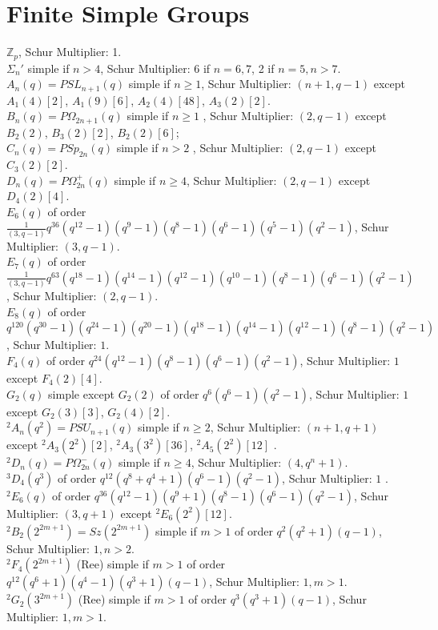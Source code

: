 \section{Finite Simple Groups}
${\mathbb Z}_p$, Schur Multiplier: 1.
\\
$\Sigma_n'$ simple if $n>4$,
Schur Multiplier: 6 if $n= 6,7$, 2 if $n=5, n>7$.
\\
$A_n (q) = PSL_{n+1}(q)$ simple if $ n \geq 1$, 
Schur Multiplier: $(n+1,q-1)$ except 
$A_1(4) [2]$,
$A_1(9) [6]$,
$A_2(4) [48]$,
$A_3(2) [2]$.
\\
$B_n (q)= P\Omega_{2n+1}(q)$
simple if $ n \geq 1$ , Schur Multiplier: $(2,q-1)$ except
$B_2(2)$,
$B_3(2) [2]$,
$B_2(2) [6]$;
\\
$C_n (q)= PSp_{2n} (q)$ simple if $n > 2$ , Schur Multiplier: 
$(2,q-1)$ except $C_3(2) [2]$.
\\
$D_n (q)= P\Omega_{2n}^{+}(q)$ simple if $n \geq 4$, 
Schur Multiplier: $(2,q-1)$ except $D_4(2) [4]$.
\\
$E_6 (q)$ of order 
${\frac 1 {(3,q-1)}} q^{36} (q^{12}-1)(q^{9}-1) (q^{8}-1) (q^{6}-1) (q^{5}-1) (q^{2}-1)$, 
Schur Multiplier: $(3,q-1)$.
\\
$E_7 (q)$ 
of order 
${\frac 1 {(3,q-1)}} q^{63} (q^{18}-1) (q^{14}-1) (q^{12}-1) 
(q^{10}-1) (q^{8}-1) (q^{6}-1) (q^{2}-1)$, 
Schur Multiplier: $(2,q-1)$.
\\
$E_8 (q)$ 
of order 
$q^{120} (q^{30}-1) (q^{24}-1) (q^{20}-1) 
(q^{18}-1) (q^{14}-1) (q^{12}-1) (q^{8}-1) (q^{2}-1)$, 
Schur Multiplier: $1$.
\\
$F_4 (q)$ of order $q^{24} (q^{12}-1) (q^{8}-1) (q^{6}-1) (q^{2}-1)$, 
Schur Multiplier: $1$ except $F_4(2)[4]$.
\\
$G_2 (q)$ simple except $G_2(2)$
of order 
$q^{6} (q^{6}-1)(q^{2}-1)$, 
Schur Multiplier: $1$ except $G_2(3) [3]$, $G_2(4) [2]$.
\\
$^2A_n (q^2) = PSU_{n+1}(q)$ simple if $ n \geq 2$, Schur Multiplier: 
$(n+1, q+1)$ except
$^2A_3(2^2) [2]$,
$^2A_3(3^2) [36]$,
$^2A_5(2^2) [12]$ .
\\
$^2D_n (q)= P\Omega_{2n}^{-}(q)$
simple if $ n \geq 4$, Schur Multiplier: $(4, q^n+1)$.
\\
$^3D_4 (q^3)$ 
of order 
$q^{12} (q^{8}+q^4+1) (q^{6}-1) (q^{2}-1)$, 
Schur Multiplier: $1$ .
\\
$^2E_6 (q)$ 
of order 
$q^{36} (q^{12}-1) (q^{9}+1) (q^{8}-1) (q^{6}-1) (q^{2}-1)$, 
Schur Multiplier: $(3,q+1)$ except
$^2E_6(2^2) [12]$.
\\
$^2B_2 (2^{2m+1})= Sz(2^{2m+1})$
simple if $ m > 1$ 
of order 
$q^{2} (q^{2}+1) (q-1)$, 
Schur Multiplier: $1, n>2$.
\\
$^2F_4 (2^{2m+1})$ (Ree) simple if $ m >1$
of order 
$q^{12} (q^{6}+1) (q^{4}-1) (q^{3}+1) (q-1)$, 
Schur Multiplier: $1, m>1$.
\\
$^2G_2 (3^{2m+1})$ (Ree) simple if $ m > 1$
of order 
$q^{3} (q^{3}+1) (q-1)$, 
Schur Multiplier: $1, m>1$.
